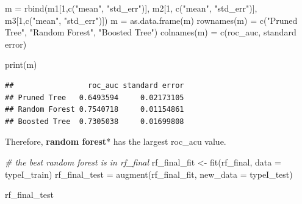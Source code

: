 \documentclass[
]{article}
\newenvironment{Shaded}{\begin{snugshade}}{\end{snugshade}}
\newcommand{\AttributeTok}[1]{\textcolor[rgb]{0.77,0.63,0.00}{#1}}
\newcommand{\CommentTok}[1]{\textcolor[rgb]{0.56,0.35,0.01}{\textit{#1}}}
\newcommand{\DecValTok}[1]{\textcolor[rgb]{0.00,0.00,0.81}{#1}}
\newcommand{\FunctionTok}[1]{\textcolor[rgb]{0.00,0.00,0.00}{#1}}
\newcommand{\NormalTok}[1]{#1}
\newcommand{\OtherTok}[1]{\textcolor[rgb]{0.56,0.35,0.01}{#1}}
\newcommand{\StringTok}[1]{\textcolor[rgb]{0.31,0.60,0.02}{#1}}
\begin{document}
\begin{Shaded}
\begin{Highlighting}[]
\NormalTok{m }\OtherTok{=} \FunctionTok{rbind}\NormalTok{(m1[}\DecValTok{1}\NormalTok{,}\FunctionTok{c}\NormalTok{(}\StringTok{"mean"}\NormalTok{, }\StringTok{"std\_err"}\NormalTok{)], m2[}\DecValTok{1}\NormalTok{, }\FunctionTok{c}\NormalTok{(}\StringTok{"mean"}\NormalTok{, }\StringTok{"std\_err"}\NormalTok{)], }
\NormalTok{          m3[}\DecValTok{1}\NormalTok{,}\FunctionTok{c}\NormalTok{(}\StringTok{"mean"}\NormalTok{, }\StringTok{"std\_err"}\NormalTok{)])}
\NormalTok{m }\OtherTok{=} \FunctionTok{as.data.frame}\NormalTok{(m)}
\FunctionTok{rownames}\NormalTok{(m) }\OtherTok{=} \FunctionTok{c}\NormalTok{(}\StringTok{"Pruned Tree"}\NormalTok{, }\StringTok{"Random Forest"}\NormalTok{, }\StringTok{"Boosted Tree"}\NormalTok{) }
\FunctionTok{colnames}\NormalTok{(m) }\OtherTok{=} \FunctionTok{c}\NormalTok{(}\StringTok{\textquotesingle{}roc\_auc\textquotesingle{}}\NormalTok{, }\StringTok{\textquotesingle{}standard error\textquotesingle{}}\NormalTok{)}

\FunctionTok{print}\NormalTok{(m)}
\end{Highlighting}
\end{Shaded}

\begin{verbatim}
##                 roc_auc standard error
## Pruned Tree   0.6493594     0.02173105
## Random Forest 0.7540718     0.01154861
## Boosted Tree  0.7305038     0.01699808
\end{verbatim}

Therefore, \textbf{random forest}* has the largest roc\_acu value.

\begin{Shaded}
\begin{Highlighting}[]
\CommentTok{\# the best random forest is in rf\_final}
\NormalTok{rf\_final\_fit }\OtherTok{\textless{}{-}} \FunctionTok{fit}\NormalTok{(rf\_final, }\AttributeTok{data =}\NormalTok{ typeI\_train)}
\NormalTok{rf\_final\_test }\OtherTok{=} \FunctionTok{augment}\NormalTok{(rf\_final\_fit, }\AttributeTok{new\_data =}\NormalTok{ typeI\_test)}
\end{Highlighting}
\end{Shaded}

\begin{Shaded}
\begin{Highlighting}[]
\NormalTok{rf\_final\_test}
\end{Highlighting}
\end{Shaded}
\end{document}
